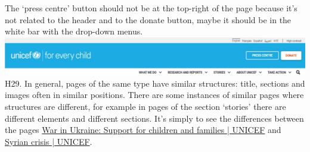 \newline The ‘press centre’ button should not be at the top-right of the page because it’s not related to the header and to the donate button, maybe it should be in the white bar with the drop-down menus.
\newline \includegraphics[width=\textwidth]{FinalScores32.jpg}
\newline
\newline H29.	In general, pages of the same type have similar structures: title, sections and images often in similar positions. There are some instances of similar pages where structures are different, for example in pages of the section ‘stories’ there are different elements and different sections.
\newline It’s simply to see the differences between the pages \href{https://www.unicef.org/emergencies/war-ukraine-pose-immediate-threat-children}{War in Ukraine: Support for children and families | UNICEF} and \href{https://www.unicef.org/emergencies/syrian-crisis}{Syrian crisis | UNICEF}.




















